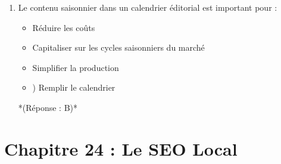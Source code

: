 \documentclass[12pt,a4paper,twoside]{report}
\begin{document}
\begin{enumerate}
\item Le contenu saisonnier dans un calendrier éditorial est important pour :
\begin{itemize}
\item[A)] Réduire les coûts
\item[B)] Capitaliser sur les cycles saisonniers du marché
\item[C)] Simplifier la production
\item[D]) Remplir le calendrier
\end{itemize}
*(Réponse : B)*

\end{enumerate}

\section*{Chapitre 24 : Le SEO Local}
\end{document}
